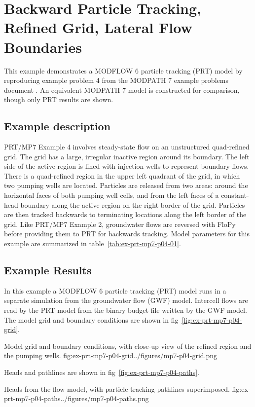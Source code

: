 \section{Backward Particle Tracking, Refined Grid, Lateral Flow Boundaries}

This example demonstrates a MODFLOW 6 particle tracking (PRT) model by reproducing example problem 4 from the MODPATH 7 \citep{pollock2016modpath7} example problems document \citep{modpath7examples}. An equivalent MODPATH 7 model is constructed for comparison, though only PRT results are shown.

\subsection{Example description}

PRT/MP7 Example 4 involves steady-state flow on an unstructured quad-refined grid. The grid has a large, irregular inactive region around its boundary. The left side of the active region is lined with injection wells to represent boundary flows. There is a quad-refined region in the upper left quadrant of the grid, in which two pumping wells are located. Particles are released from two areas: around the horizontal faces of both pumping well cells, and from the left faces of a constant-head boundary along the active region on the right border of the grid. Particles are then tracked backwards to terminating locations along the left border of the grid. Like PRT/MP7 Example 2, groundwater flows are reversed with FloPy before providing them to PRT for backwards tracking. Model parameters for this example are summarized in table~\ref{tab:ex-prt-mp7-p04-01}.



\subsection{Example Results}

In this example a MODFLOW 6 particle tracking (PRT) model runs in a separate simulation from the groundwater flow (GWF) model. Intercell flows are read by the PRT model from the binary budget file written by the GWF model. The model grid and boundary conditions are shown in fig~\ref{fig:ex-prt-mp7-p04-grid}.

\begin{StandardFigure}{
    Model grid and boundary conditions, with close-up view of the refined region and the pumping wells.
    }{fig:ex-prt-mp7-p04-grid}{../figures/mp7-p04-grid.png}
\end{StandardFigure}

Heads and pathlines are shown in fig~\ref{fig:ex-prt-mp7-p04-paths}.

\begin{StandardFigure}{
    Heads from the flow model, with particle tracking pathlines superimposed.
    }{fig:ex-prt-mp7-p04-paths}{../figures/mp7-p04-paths.png}
\end{StandardFigure}
